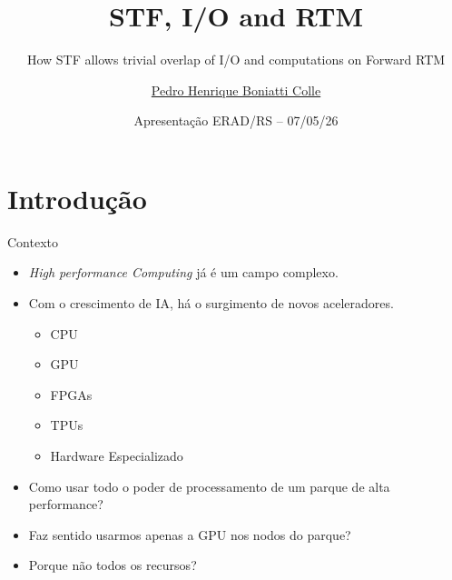 \documentclass{beamer}
\title{STF, I/O and RTM}
\subtitle{How STF allows trivial overlap of I/O and computations on Forward RTM }
\author{\href{mailto:phbcolle@inf.ufrgs.br}{Pedro Henrique Boniatti Colle}}
\date{Apresentação ERAD/RS -- 07/05/26}
\begin{document}
\maketitle



\section{Introdução}

\begin{frame}{Contexto}
  \begin{itemize}
  \item<+-> \textit{High performance Computing} já é um campo complexo.
  \item<+-> Com o crescimento de IA, há o surgimento de novos aceleradores.
    \begin{itemize}
    \item<+-> CPU
    \item<+-> GPU
    \item<+-> FPGAs
    \item<+-> TPUs
    \item<+-> Hardware Especializado
    \end{itemize}
  \item<+-> Como usar todo o poder de processamento de um parque de alta performance?
  \item<+-> Faz sentido usarmos apenas a GPU nos nodos do parque?
  \item<+-> Porque não todos os recursos?
  \end{itemize}
\end{frame}
\end{document}
